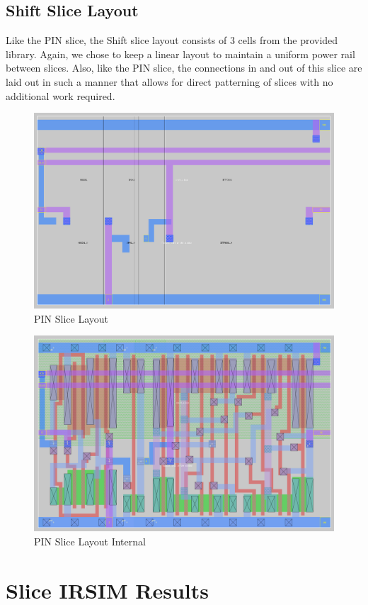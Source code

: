     \subsection{Shift Slice Layout}
        Like the PIN slice, the Shift slice layout consists of 3 cells from the provided library.
        Again, we chose to keep a linear layout to maintain a uniform power rail between slices.
        Also, like the PIN slice, the connections in and out of this slice are laid out in such a manner
        that allows for direct patterning of slices with no additional work required.
        \begin{figure}[H]
            \centering
            \includegraphics[width=0.75\linewidth]{../../magic/images/shift_slice.png}
            \caption{PIN Slice Layout}
        \end{figure}
        \begin{figure}[H]
            \centering
            \includegraphics[width=0.75\linewidth]{../../magic/images/shift_slice_internal.png}
            \caption{PIN Slice Layout Internal}
        \end{figure}

\newpage
\section{Slice IRSIM Results}

